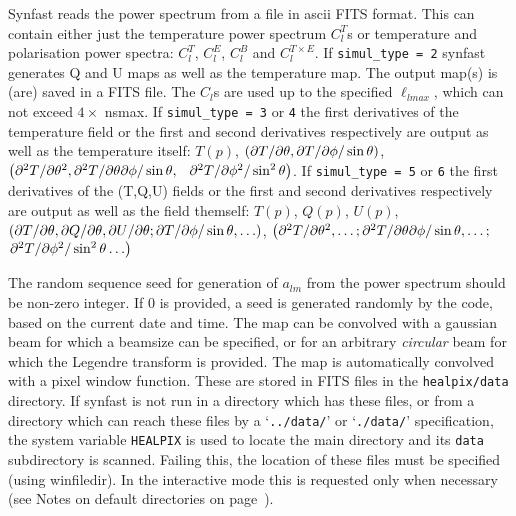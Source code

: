 \begin{codedescription}
{%
Synfast reads the power spectrum from a file in  ascii FITS
format. This can contain either just the temperature power spectrum $C^T_l$s or 
temperature and polarisation power spectra: $C^T_l$, $C^E_l$, $C^B_l$
and $C^{T\times E}_l$. If {\tt simul\_type = 2} synfast generates 
Q and U maps as well as the temperature map. The output map(s)
is (are) saved in a FITS file. 
The $C_l$s are used up to the specified 
$\ell_{lmax}$, which can not exceed $4\times$ nsmax. If {\tt simul\_type = 3} or
{\tt 4} the first derivatives of the temperature field or the first and second derivatives respectively
are output as well as the temperature itself: $T(p)$, $\left({\partial T}/{\partial \theta}, {\partial T}/{\partial \phi}/\sin\theta \right)
$, $\left({\partial^2 T}/{\partial \theta^2}, {\partial^2 T}/{\partial
  \theta\partial\phi}/\sin\theta,\right.$ 
$\left.{\partial^2 T}/{\partial \phi^2}/\sin^2\theta \right)$.
If {\tt simul\_type = 5} or
{\tt 6} the first derivatives of the (T,Q,U) fields or the first and second derivatives respectively
are output as well as the field themself: $T(p)$,  $Q(p)$,  $U(p)$,
$\left({\partial T}/{\partial \theta}, {\partial Q}/{\partial \theta}, {\partial
  U}/{\partial \theta}; {\partial T}/{\partial \phi}/\sin\theta, \ldots \right)
$, $\left({\partial^2 T}/{\partial \theta^2},\ldots; {\partial^2 T}/{\partial
  \theta\partial\phi}/\sin\theta,\ldots ;\right.$ 
$\left.{\partial^2 T}/{\partial \phi^2}/\sin^2\theta \ldots \right)$

The random sequence seed for generation of $a_{lm}$ from the
power spectrum should be non-zero integer. If 0 is provided, a seed is generated
randomly by the code, based on the current date and time.
The map can be convolved with a gaussian beam for which a beamsize can
be specified, or for an arbitrary {\em circular} beam for which the
Legendre transform is provided. The map is automatically convolved with a pixel window
function. These are stored in FITS files  in
the {\tt healpix/data} directory. If synfast is not run in a directory
which has these files, or from a directory which can reach these files
by a `{\tt ../data/}' or `{\tt ./data/}' specification, the system
variable {\tt HEALPIX} is used to locate the main \healpix directory
and its {\tt data} subdirectory is scanned. Failing this, the location of these
files must be specified (using winfiledir). In the interactive mode this is
requested only when necessary (see Notes on default directories on page~\pageref{page:defdir}).

}
\end{codedescription}

